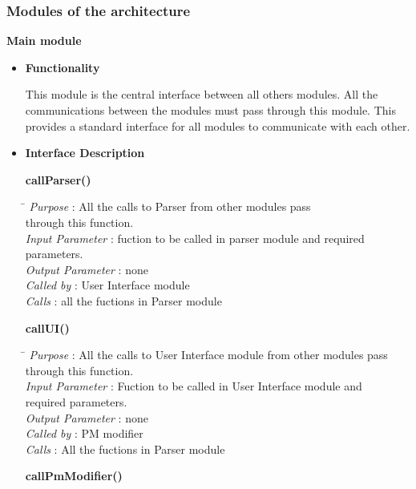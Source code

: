 \documentclass[a4paper,11pt]{article}
\begin{document}
\subsubsection{Modules of the architecture }
\textbf{Main module}
\begin{itemize}
\item \textbf{Functionality}

This module is the central interface between all others modules. All the communications between the modules must pass through this module. This provides a 
standard interface for all modules to communicate with each other.

\item \textbf{Interface Description}

\textbf{callParser()}
  
\begin{tabbing}
\hspace*{4cm}\= \kill
 \textit{Purpose} \> : All the calls to Parser from other modules pass \\ \>through this function.\\
  \textit{Input Parameter} \> : fuction to be called in parser module and required parameters. \\
  \textit{Output Parameter} \> : none \\
  \textit{Called by} \> : User Interface module \\
  \textit{Calls} \> : all the fuctions in Parser module\\
\end{tabbing}
\textbf{callUI()}
  
\begin{tabbing}
\hspace*{4cm}\= \kill
 \textit{Purpose} \> : All the calls to User Interface module from other modules pass \\ \>through this function.\\
  \textit{Input Parameter} \> : Fuction to be called in User Interface module and \\ \>required parameters. \\
  \textit{Output Parameter} \> : none \\
  \textit{Called by} \> : PM modifier \\
  \textit{Calls} \> : All the fuctions in Parser module\\
\end{tabbing}
\textbf{callPmModifier()}
  

\end{itemize}
\end{document}

